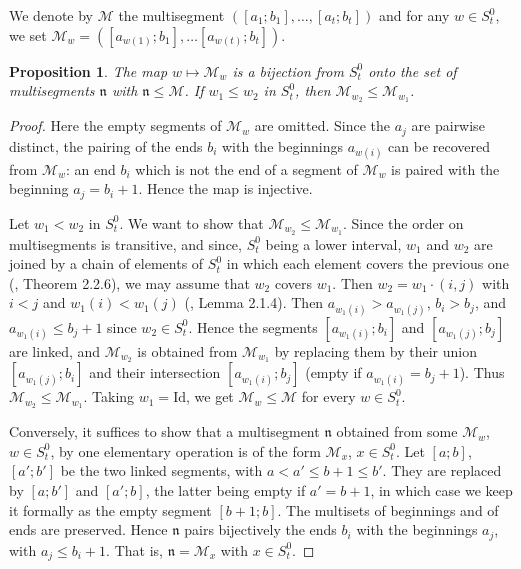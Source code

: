 \documentclass[a4paper,12pt,leqno]{amsart}
\newcommand{\frn}{\mathfrak{n}}
\newcommand{\caM}{\mathcal{M}}
\theoremstyle{plain}
\newtheorem{prop}[thm]{Proposition}
\theoremstyle{definition}
\theoremstyle{definition}
\newcommand{\Id}{\mathrm{Id}}
\begin{document}
We denote by $\caM$ the multisegment  $([a_1; b_1], \ldots , [a_t; b_t ])$ and for any
$w \in S_t^0$, we set $\caM_w=  ([a_{w(1)}; b_1], \ldots  [a_{w(t)}; b_t ])$.


\begin{prop}\label{prop:zelorder} The map $w\mapsto\caM_w$ is a bijection from $S_t^0$ onto the set
of multisegments $\frn$ with $\frn\leq\caM$. If $w_1\leq w_2$ in $S_t^0$, then $\caM_{w_2}\leq\caM_{w_1}$.
\end{prop}

\begin{proof}
Here the empty segments of $\caM_w$ are omitted. Since the $a_j$ are pairwise distinct, the pairing
of the ends $b_i$ with the beginnings $a_{w(i)}$ can be recovered from $\caM_w$: an end $b_i$ which
is not the end of a segment of $\caM_w$ is paired with the beginning $a_j=b_i+1$. Hence the map is injective.

Let $w_1<w_2$ in $S_t^0$. We want to show that $\caM_{w_2}\leq\caM_{w_1}$. Since the order on
multisegments is transitive, and since, $S_t^0$ being a lower interval, $w_1$ and $w_2$ are joined by
a chain of elements of $S_t^0$ in which each element covers the previous one (\cite{BB05}, Theorem
2.2.6), we may assume that $w_2$ covers $w_1$. Then $w_2=w_1\cdot(i,j)$ with $i<j$ and
$w_1(i)<w_1(j)$ (\cite{BB05}, Lemma 2.1.4). Then $a_{w_1(i)}>a_{w_1(j)}$, $b_i>b_j$, and $a_{w_1(i)}\leq b_j+1$ since $w_2\in
S_t^0$. Hence the segments $[a_{w_1(i)};b_i]$ and $[a_{w_1(j)};b_j]$ are linked, and $\caM_{w_2}$
is obtained from $\caM_{w_1}$ by replacing them by their union $[a_{w_1(j)};b_i]$ and their
intersection $[a_{w_1(i)};b_j]$ (empty if $a_{w_1(i)}=b_j+1$). Thus $\caM_{w_2}\leq\caM_{w_1}$.
Taking $w_1=\Id$, we get $\caM_w\leq\caM$ for every $w\in S_t^0$.

Conversely, it suffices to show that a multisegment $\frn$ obtained from some $\caM_w$, $w\in
S_t^0$, by one elementary operation is of the form $\caM_x$, $x\in S_t^0$. Let $[a;b]$, $[a';b']$
be the two linked segments, with $a<a'\leq b+1\leq b'$. They are replaced by $[a;b']$ and $[a';b]$,
the latter being empty if $a'=b+1$, in which case we keep it formally as the empty segment
$[b+1;b]$. The multisets of beginnings and of ends are preserved. Hence $\frn$ pairs bijectively
the ends $b_i$ with the beginnings $a_j$, with $a_j\leq b_i+1$. That is, $\frn=\caM_x$ with $x\in S_t^0$.
\end{proof}
\end{document}

